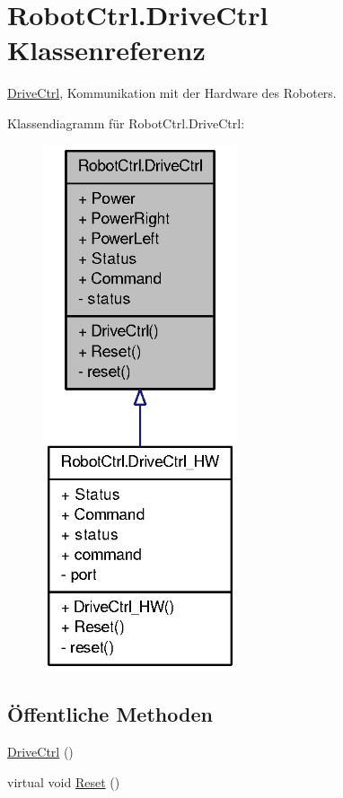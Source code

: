 \hypertarget{class_robot_ctrl_1_1_drive_ctrl}{
\section{RobotCtrl.DriveCtrl Klassenreferenz}
\label{class_robot_ctrl_1_1_drive_ctrl}
}


\hyperlink{class_robot_ctrl_1_1_drive_ctrl}{DriveCtrl}, Kommunikation mit der Hardware des Roboters.  




Klassendiagramm für RobotCtrl.DriveCtrl:\nopagebreak
\begin{figure}[H]
\begin{center}
\leavevmode
\includegraphics[width=162pt]{class_robot_ctrl_1_1_drive_ctrl__inherit__graph}
\end{center}
\end{figure}
\subsection*{Öffentliche Methoden}
\begin{DoxyCompactItemize}
\item 
\hyperlink{class_robot_ctrl_1_1_drive_ctrl_a8f8e2ebe491712cb323748f7ecc4859a}{DriveCtrl} ()
\item 
virtual void \hyperlink{class_robot_ctrl_1_1_drive_ctrl_a721795047bfe5d2cca3fab6eeb0ab905}{Reset} ()
\end{DoxyCompactItemize}
